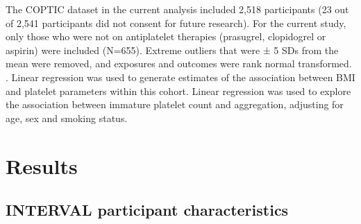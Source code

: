 \documentclass[11pt,twoside]{bristolthesis}
\begin{document}
The COPTIC dataset in the current analysis included 2,518 participants (23 out of 2,541 participants did not consent for future research). For the current study, only those who were not on antiplatelet therapies (prasugrel, clopidogrel or aspirin) were included (N=655). Extreme outliers that were ± 5 SDs from the mean were removed, and exposures and outcomes were rank normal transformed. . Linear regression was used to generate estimates of the association between BMI and platelet parameters within this cohort. Linear regression was used to explore the association between immature platelet count and aggregation, adjusting for age, sex and smoking status.

\hypertarget{results}{%
\section{Results}\label{results}}

\hypertarget{interval-participant-characteristics}{%
\subsection{INTERVAL participant characteristics}\label{interval-participant-characteristics}}
\end{document}
